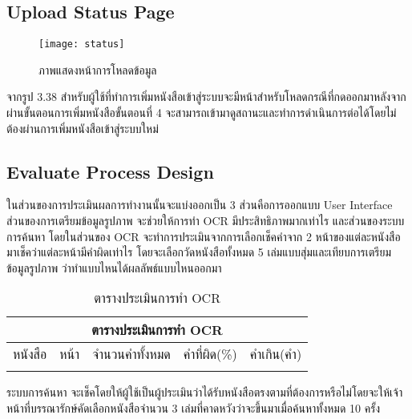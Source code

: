 \subsection{Upload Status Page}
\begin{figure}[H]
    \centering
    \texttt{[image: status]}
    \caption{ภาพแสดงหน้าการโหลดข้อมูล}\label{fig:status}
\end{figure}
จากรูป 3.38 สำหรับผู้ใช้ที่ทำการเพิ่มหนังสือเข้าสู่ระบบจะมีหน้าสำหรับโหลดกรณีที่กดออกมาหลังจากผ่านขั้นตอนการเพิ่มหนังสือขั้นตอนที่ 4 จะสามารถเข้ามาดูสถานะและทำการดำเนินการต่อได้โดยไม่ต้องผ่านการเพิ่มหนังสือเข้าสู่ระบบใหม่


\subsection{Evaluate Process Design}

ในส่วนของการประเมินผลการทำงานนั้นจะแบ่งออกเป็น 3 ส่วนคือการออกแบบ User Interface ส่วนของการเตรียมข้อมูลรูปภาพ จะช่วยให้การทำ OCR มีประสิทธิภาพมากเท่าไร และส่วนของระบบการค้นหา โดยในส่วนของ OCR จะทำการประเมินจากการเลือกเช็คคำจาก 2 หน้าของแต่ละหนังสือมาเช็คว่าแต่ละหน้ามีคำผิดเท่าไร โดยจะเลือกวัดหนังสือทั้งหมด 5 เล่มแบบสุ่มและเทียบการเตรียมข้อมูลรูปภาพ ว่าทำแบบไหนได้ผลลัพธ์แบบไหนออกมา

\begin{table}[H]
\caption{ตารางประเมินการทำ OCR}\label{tbl:ocr}
\begin{tabular}{|c|c|c|c|c|}
\hline
\multicolumn{5}{|c|}{ตารางประเมินการทำ OCR}                 \\ \hline
หนังสือ & หน้า & จำนวนคำทั้งหมด & คำที่ผิด(\%) & คำเกิน(คำ) \\ \hline
        &      &                &              &            \\ \hline
\end{tabular}
\end{table}

ระบบการค้นหา จะเช็คโดยให้ผู้ใช้เป็นผู้ประเมินว่าได้รับหนังสือตรงตามที่ต้องการหรือไม่โดยจะให้เจ้าหน้าที่บรรณารักษ์คัดเลือกหนังสือจำนวน 3 เล่มที่คาดหวังว่าจะขึ้นมาเมื่อค้นหาทั้งหมด 10 ครั้ง


